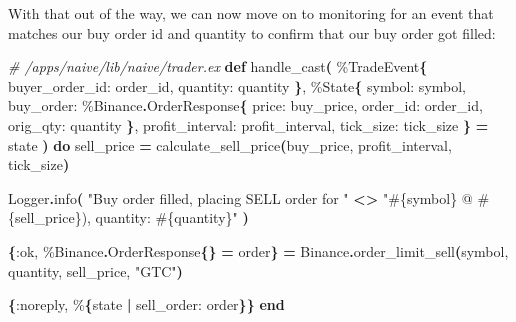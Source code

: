 \documentclass[
  oneside]{book}
\newenvironment{Shaded}{\begin{snugshade}}{\end{snugshade}}
\newcommand{\CommentTok}[1]{\textcolor[rgb]{0.56,0.35,0.01}{\textit{#1}}}
\newcommand{\ConstantTok}[1]{\textcolor[rgb]{0.56,0.35,0.01}{#1}}
\newcommand{\FunctionTok}[1]{\textcolor[rgb]{0.13,0.29,0.53}{\textbf{#1}}}
\newcommand{\KeywordTok}[1]{\textcolor[rgb]{0.13,0.29,0.53}{\textbf{#1}}}
\newcommand{\NormalTok}[1]{#1}
\newcommand{\OperatorTok}[1]{\textcolor[rgb]{0.81,0.36,0.00}{\textbf{#1}}}
\newcommand{\OtherTok}[1]{\textcolor[rgb]{0.56,0.35,0.01}{#1}}
\newcommand{\StringTok}[1]{\textcolor[rgb]{0.31,0.60,0.02}{#1}}
\newcommand{\VariableTok}[1]{\textcolor[rgb]{0.00,0.00,0.00}{#1}}
\begin{document}
With that out of the way, we can now move on to monitoring for an event that matches our buy order id and quantity to confirm that our buy order got filled:

\begin{Shaded}
\begin{Highlighting}[]
  \CommentTok{\# /apps/naive/lib/naive/trader.ex}
  \KeywordTok{def}\NormalTok{ handle\_cast}\FunctionTok{(}
\NormalTok{        \%}\ConstantTok{TradeEvent}\FunctionTok{\{}
          \VariableTok{buyer\_order\_id:}\NormalTok{ order\_id,}
          \VariableTok{quantity:}\NormalTok{ quantity}
        \FunctionTok{\}}\NormalTok{,}
\NormalTok{        \%}\ConstantTok{State}\FunctionTok{\{}
          \VariableTok{symbol:}\NormalTok{ symbol,}
          \VariableTok{buy\_order:}\NormalTok{ \%}\ConstantTok{Binance}\OperatorTok{.}\ConstantTok{OrderResponse}\FunctionTok{\{}
            \VariableTok{price:}\NormalTok{ buy\_price,}
            \VariableTok{order\_id:}\NormalTok{ order\_id,}
            \VariableTok{orig\_qty:}\NormalTok{ quantity}
          \FunctionTok{\}}\NormalTok{,}
          \VariableTok{profit\_interval:}\NormalTok{ profit\_interval,}
          \VariableTok{tick\_size:}\NormalTok{ tick\_size}
        \FunctionTok{\}} \OperatorTok{=}\NormalTok{ state}
      \FunctionTok{)} \KeywordTok{do}
\NormalTok{    sell\_price }\OperatorTok{=}\NormalTok{ calculate\_sell\_price}\FunctionTok{(}\NormalTok{buy\_price, profit\_interval, tick\_size}\FunctionTok{)}

    \ConstantTok{Logger}\OperatorTok{.}\NormalTok{info}\FunctionTok{(}
      \StringTok{"Buy order filled, placing SELL order for "} \OperatorTok{\textless{}\textgreater{}}
        \StringTok{"}\OtherTok{\#\{}\NormalTok{symbol}\OtherTok{\}}\StringTok{ @ }\OtherTok{\#\{}\NormalTok{sell\_price}\OtherTok{\}}\StringTok{), quantity: }\OtherTok{\#\{}\NormalTok{quantity}\OtherTok{\}}\StringTok{"}
    \FunctionTok{)}

    \FunctionTok{\{}\VariableTok{:ok}\NormalTok{, \%}\ConstantTok{Binance}\OperatorTok{.}\ConstantTok{OrderResponse}\FunctionTok{\{\}} \OperatorTok{=}\NormalTok{ order}\FunctionTok{\}} \OperatorTok{=}
      \ConstantTok{Binance}\OperatorTok{.}\NormalTok{order\_limit\_sell}\FunctionTok{(}\NormalTok{symbol, quantity, sell\_price, }\StringTok{"GTC"}\FunctionTok{)}

    \FunctionTok{\{}\VariableTok{:noreply}\NormalTok{, \%}\FunctionTok{\{}\NormalTok{state }\OperatorTok{|} \VariableTok{sell\_order:}\NormalTok{ order}\FunctionTok{\}\}}
  \KeywordTok{end}
\end{Highlighting}
\end{Shaded}
\end{document}
